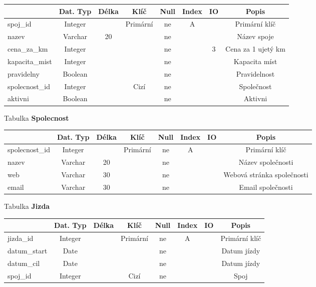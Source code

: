 \documentclass[11pt]{article}
\begin{document}
\begin{table}[H]
    \begin{tabular}{|l|c|c|c|c|c|c|c|} \hline
                    & Dat. Typ  & Délka & Klíč      & Null  & Index & IO    & Popis \\ \hline
    spoj\_id	    & Integer   &		& Primární  & ne	& A		&       & Primární klíč \\ \hline
    nazev	        & Varchar	& 20	&	        & ne	&		&       & Název spoje \\ \hline
    cena\_za\_km	& Integer	&	    &	        & ne	&	    & 3     & Cena za 1 ujetý km \\ \hline
    kapacita\_mist	& Integer	&	    &	        & ne	&		&       & Kapacita míst \\ \hline
    pravidelny	    & Boolean	&		&           & ne	&		&       & Pravidelnost \\ \hline
    spolecnost\_id	& Integer	&	    & Cizí	    & ne	&		&       & Společnost \\ \hline
    aktivni	        & Boolean	&		&           & ne	&		&       & Aktivni \\ \hline
    \end{tabular}
\end{table}

\noindent
Tabulka \textbf{Spolecnost}

\begin{table}[H]
    \begin{tabular}{|l|c|c|c|c|c|c|c|} \hline
                        & Dat. Typ  & Délka & Klíč      & Null  & Index & IO    & Popis \\ \hline
        spolecnost\_id	& Integer	&	    & Primární	& ne	& A		&       & Primární klíč \\ \hline
        nazev	        & Varchar	& 20	&	        & ne	&		&       & Název společnosti \\ \hline
        web             & Varchar   & 30    &           & ne    &       &       & Webová stránka společnosti \\ \hline
        email           & Varchar   & 30    &           & ne    &       &       & Email společnosti \\ \hline
    \end{tabular}
\end{table}

\noindent
Tabulka \textbf{Jizda}

\begin{table}[H]
    \begin{tabular}{|l|c|c|c|c|c|c|c|} \hline
                    & Dat. Typ  & Délka & Klíč      & Null  & Index & IO    & Popis \\ \hline
        jizda\_id	& Integer	&	    & Primární	& ne	& A		&       & Primární klíč \\ \hline
        datum\_start& Date		&	    &           & ne	&		&       & Datum jízdy \\ \hline
        datum\_cil	& Date		&	    &           & ne	&		&       & Datum jízdy \\ \hline
        spoj\_id	& Integer	&	    & Cizí	    & ne	&   	&	    & Spoj \\ \hline
    \end{tabular}
\end{table}
\end{document}
